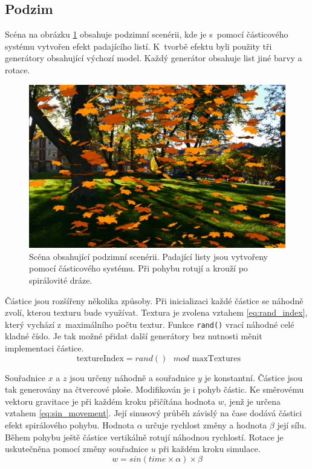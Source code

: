 \subsection*{Podzim}
Scéna na obrázku \ref{fig:ps_podzim} obsahuje podzimní scenérii, kde je s~pomocí částicového systému vytvořen efekt padajícího listí. K~tvorbě efektu byli použity tři generátory obsahující výchozí model. Každý generátor obsahuje list jiné barvy a rotace.  

\begin{figure}[H]
	\centering
	\includegraphics[width=1.0\textwidth]{obrazky-figures/podzim.png}
	\caption{Scéna obsahující podzimní scenérii. Padající listy jsou vytvořeny pomocí částicového systému. Při pohybu rotují a krouží po spirálovité dráze.}
	\label{fig:ps_podzim}
\end{figure}

Částice jsou rozšířeny několika způsoby. Při inicializaci každé částice se náhodně zvolí, kterou texturu bude využívat. Textura je zvolena vztahem \ref{eq:rand_index}, který vychází z~maximálního počtu textur. Funkce \texttt{rand()} vrací náhodné celé kladné číslo. Je tak možné přidat další generátory bez nutnosti měnit implementaci částice.
\begin{equation}
    \label{eq:rand_index}
    \text{ textureIndex} = rand() \text{ } mod \text{ maxTextures} 
\end{equation}

Souřadnice $x$ a $z$ jsou určeny náhodně a souřadnice $y$ je konstantní. Částice jsou tak generovány na čtvercové ploše. Modifikován je i pohyb částic. Ke směrovému vektoru gravitace je při každém kroku přičítána hodnota $w$, jenž je určena vztahem \ref{eq:sin_movement}. Její sinusový průběh závislý na čase dodává částici efekt spirálového pohybu. Hodnota $\alpha$ určuje rychlost změny a hodnota $\beta$ její sílu. Během pohybu ještě částice vertikálně rotují náhodnou rychlostí. Rotace je uskutečněna pomocí změny souřadnice $u$ při každém kroku simulace. 
\begin{equation}
    \label{eq:sin_movement}
    w = sin(time \times \alpha) \times \beta
\end{equation}

